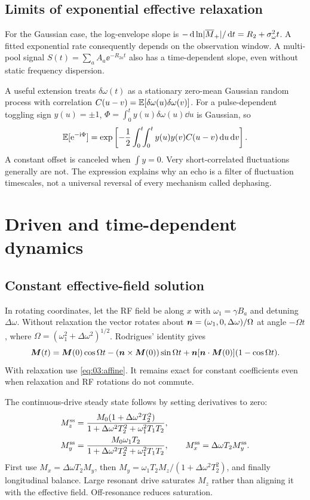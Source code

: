 \subsection{Limits of exponential effective relaxation}
For the Gaussian case, the log-envelope slope is
$-\mathop{}\!\mathrm{d}\ln\lvert\overline M_+\rvert/\mathop{}\!\mathrm{d} t=R_2+\sigma_\omega^2t$.
A fitted exponential rate consequently depends on the observation window.
A multi-pool signal
$S(t)=\sum_a A_a\ee^{-R_{2a}t}$ also has a time-dependent slope,
even without static frequency dispersion.

A useful extension treats $\delta\omega(t)$ as a stationary zero-mean
Gaussian random process with correlation
$C(u-v)=\operatorname{\mathbb{E}}[\delta\omega(u)\delta\omega(v)]$.
For a pulse-dependent toggling sign $y(u)=\pm1$,
$\Phi=\int_0^t y(u)\delta\omega(u)\dd u$ is Gaussian, so
\[
 \operatorname{\mathbb{E}}[\mathrm{e}^{-\mathrm{i}\Phi}]
 =\exp\left[-\frac12\int_0^t\!\!\int_0^t
                  y(u)y(v)C(u-v)\mathop{}\!\mathrm{d} u\mathop{}\!\mathrm{d} v\right].
\]
A constant offset is canceled when $\int y=0$.
Very short-correlated fluctuations generally are not.
The expression explains why an echo is a filter of fluctuation timescales,
not a universal reversal of every mechanism called dephasing.

\section{Driven and time-dependent dynamics}
\label{sec:03:driven-and-time-dependent-dynamics}
\subsection{Constant effective-field solution}
In rotating coordinates, let the RF field be along $x$ with
$\omega_1=\gamma B_a$ and detuning $\Delta\omega$.
Without relaxation the vector rotates about
$\bm{n}=(\omega_1,0,\Delta\omega)/\Omega$ at angle $-\Omega t$,
where $\Omega=(\omega_1^2+\Delta\omega^2)^{1/2}$.
Rodrigues' identity gives
\[
 \bm{M}(t)=\bm{M}(0)\cos\Omega t
 -(\bm{n}\times\bm{M}(0))\sin\Omega t
 +\bm{n}[\bm{n}\cdot\bm{M}(0)](1-\cos\Omega t).
\]
With relaxation use \cref{eq:03:affine}. It remains exact for constant
coefficients even when relaxation and RF rotations do not commute.

The continuous-drive steady state follows by setting derivatives to zero:
\begin{equation}
 \begin{split}
 M_z^{\rm ss}&=\frac{M_0(1+\Delta\omega^2T_2^2)}
 {1+\Delta\omega^2T_2^2+\omega_1^2T_1T_2},\\
 M_y^{\rm ss}&=\frac{M_0\omega_1T_2}
 {1+\Delta\omega^2T_2^2+\omega_1^2T_1T_2},\qquad
 M_x^{\rm ss}=\Delta\omega T_2M_y^{\rm ss}.
 \end{split}
 \label{eq:03:cw}
\end{equation}
First use $M_x=\Delta\omega T_2M_y$, then
$M_y=\omega_1T_2M_z/(1+\Delta\omega^2T_2^2)$, and finally longitudinal
balance. Large resonant drive saturates $M_z$ rather than aligning it
with the effective field. Off-resonance reduces saturation.

